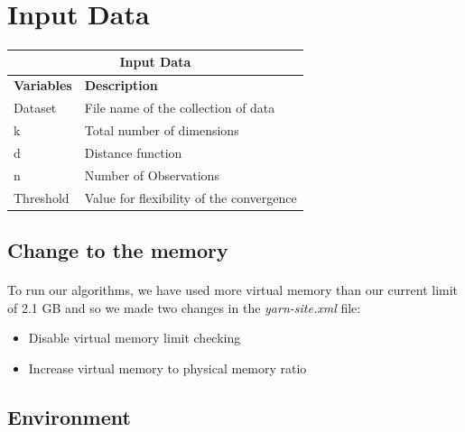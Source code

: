 \documentclass{book}
\begin{document}
    \section{Input Data}
    \paragraph{}


    \begin{tabular}{ |p{6cm}||p{6cm}|  }
        \hline
        \multicolumn{2}{|c|}{Input Data} \\
        \hline
        \textbf{Variables} & \textbf{Description} \\
        \hline
        Dataset   & File name of the collection of data   \\
	    \hline
        k&   Total number of dimensions  \\
	    \hline
        d & Distance function  \\
	    \hline
        n    & Number of Observations  \\
	    \hline
        Threshold &   Value for flexibility of the convergence  \\
        \hline
    \end{tabular}

    \subsection{Change to the memory}
    \paragraph{}
    
    To run our algorithms, we have used more virtual memory than our current limit of 2.1 GB and so we made two changes in the \textit{yarn-site.xml} file: 
    
    \begin{itemize}
        \item Disable virtual memory limit checking 
        \item Increase virtual memory to physical memory ratio 
    \end{itemize}

    \subsection{Environment}
    \paragraph{}
\end{document}
